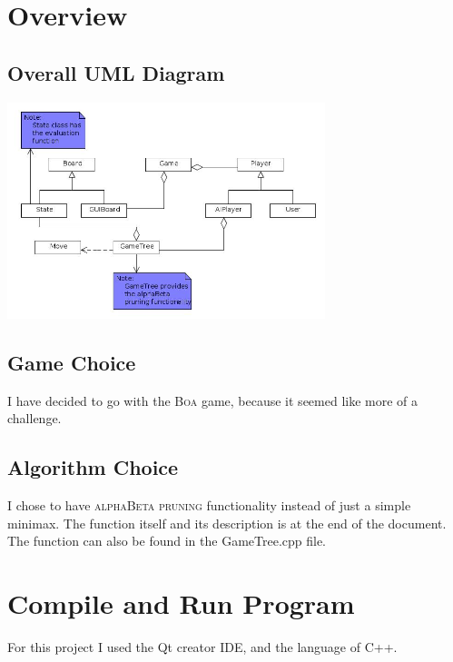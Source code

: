 \documentclass[a4paper]{article}
\begin{document}

\tableofcontents
\newpage

\section{Overview}
	\subsection{Overall UML Diagram}
		\begin{center}
			\includegraphics[width=350px]{fullUML.jpg}	
		\end{center}
	
	\subsection{Game Choice}
	I have decided to go with the \textsc{\LARGE Boa} game, because it seemed like more of a challenge.
	\subsection{Algorithm Choice}
	I chose to have \textsc{\LARGE alphaBeta pruning} functionality instead of just a simple minimax. The function itself and its 
	description is at the end of the document. The function can also be found in the GameTree.cpp file.
\section{Compile and Run Program}
For this project I used the Qt creator IDE, and the language of C++.
\end{document}
